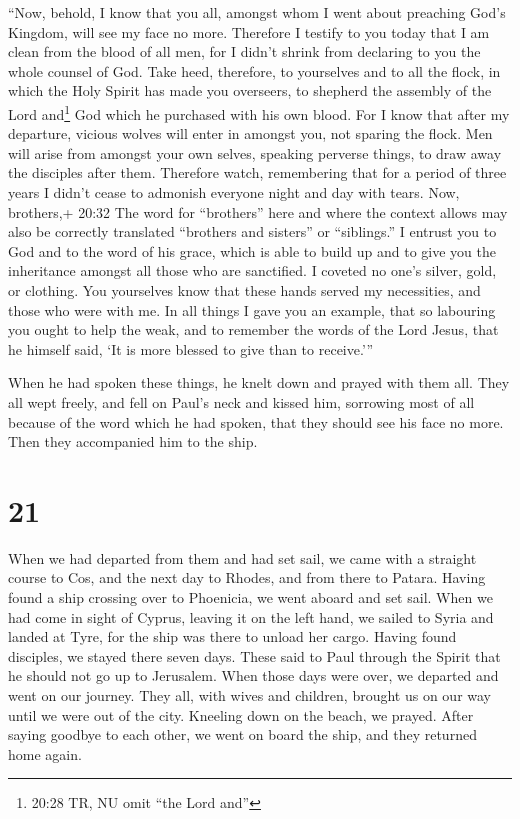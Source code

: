  ``Now, behold, I know that you all, amongst whom I went
about preaching God's Kingdom, will see my face no more. 
Therefore I testify to you today that I am clean from the blood of all
men,  for I didn't shrink from declaring to you the whole
counsel of God.  Take heed, therefore, to yourselves and to
all the flock, in which the Holy Spirit has made you overseers, to
shepherd the assembly of the Lord and\footnote{20:28 TR, NU omit ``the
  Lord and''} God which he purchased with his own blood. 
For I know that after my departure, vicious wolves will enter in amongst
you, not sparing the flock.  Men will arise from amongst
your own selves, speaking perverse things, to draw away the disciples
after them.  Therefore watch, remembering that for a period
of three years I didn't cease to admonish everyone night and day with
tears.  Now, brothers,+ 20:32 The word for ``brothers''
here and where the context allows may also be correctly translated
``brothers and sisters'' or ``siblings.'' I entrust you to God and to
the word of his grace, which is able to build up and to give you the
inheritance amongst all those who are sanctified.  I
coveted no one's silver, gold, or clothing.  You yourselves
know that these hands served my necessities, and those who were with me.
 In all things I gave you an example, that so labouring you
ought to help the weak, and to remember the words of the Lord Jesus,
that he himself said, `It is more blessed to give than to receive.'''

 When he had spoken these things, he knelt down and prayed
with them all.  They all wept freely, and fell on Paul's
neck and kissed him,  sorrowing most of all because of the
word which he had spoken, that they should see his face no more. Then
they accompanied him to the ship.

\hypertarget{section-20}{%
\section{21}\label{section-20}}

 When we had departed from them and had set sail, we came
with a straight course to Cos, and the next day to Rhodes, and from
there to Patara.  Having found a ship crossing over to
Phoenicia, we went aboard and set sail.  When we had come in
sight of Cyprus, leaving it on the left hand, we sailed to Syria and
landed at Tyre, for the ship was there to unload her cargo. 
Having found disciples, we stayed there seven days. These said to Paul
through the Spirit that he should not go up to Jerusalem. 
When those days were over, we departed and went on our journey. They
all, with wives and children, brought us on our way until we were out of
the city. Kneeling down on the beach, we prayed.  After
saying goodbye to each other, we went on board the ship, and they
returned home again.

